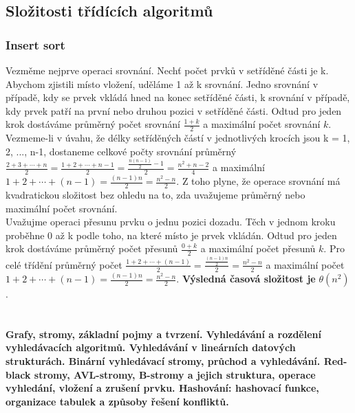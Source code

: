 \documentclass[10pt,a4paper]{article}
\begin{document}
\subsection{Složitosti třídících algoritmů}
\subsubsection{Insert sort}
Vezměme nejprve operaci srovnání. Nechť počet prvků v setříděné části je k. Abychom zjistili místo vložení, uděláme 1 až k srovnání. Jedno srovnání v případě, kdy se prvek vkládá hned na konec setříděné části, k srovnání v případě, kdy prvek patří na první nebo druhou pozici v setříděné části. Odtud pro jeden krok dostáváme průměrný počet srovnání $\frac{1+k}{2}$ a maximální počet srovnání $k$. Vezmeme-li v úvahu, že délky setříděných částí v jednotlivých krocích jsou k = 1, 2, ..., n-1, dostaneme celkové počty srovnání průměrný $\frac{2+3+\cdots+n}{2} = \frac{1+2+\cdots+n-1}{2} = \frac{\frac{n(n-1)}{2}-1}{2} = \frac{n^2+n-2}{4}$ a maximální $1+2+\cdots+(n-1) = \frac{(n-1)n}{2} = \frac{n^2-n}{2}$. Z toho plyne, že operace srovnání má kvadratickou složitost bez ohledu na to, zda uvažujeme průměrný nebo maximální počet srovnání. \\
Uvažujme operaci přesunu prvku o jednu pozici dozadu. Těch v jednom kroku proběhne 0 až k podle toho, na které místo je prvek vkládán. Odtud pro jeden krok dostáváme průměrný počet přesunů $\frac{0+k}{2}$ a maximální počet přesunů $k$. Pro celé třídění průměrný počet $\frac{1+2+\cdots+(n-1)}{2} = \frac{\frac{(n-1)n}{2}}{2} = \frac{n^2-n}{2}$ a maximální počet $1+2+\cdots+(n-1) = \frac{(n-1)n}{2} = \frac{n^2-n}{2}$. \textbf{Výsledná časová složitost je} $\theta (n^2)$.





\newpage

\section{}
\paragraph{Grafy, stromy, základní pojmy a tvrzení. Vyhledávání a rozdělení vyhledávacích algoritmů. Vyhledávání v lineárních datových strukturách. Binární vyhledávací stromy, průchod a vyhledávání. Red-black stromy, AVL-stromy, B-stromy a jejich struktura, operace vyhledání, vložení a zrušení prvku. Hashování: hashovací funkce, organizace tabulek a způsoby řešení konfliktů.}
\end{document}
